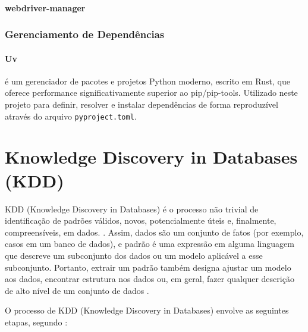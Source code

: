 \paragraph{webdriver-manager} 

\subsubsection{Gerenciamento de Dependências}

\paragraph{Uv} é um gerenciador de pacotes e projetos Python moderno, escrito em Rust, que oferece performance significativamente superior ao pip/pip-tools. Utilizado neste projeto para definir, resolver e instalar dependências de forma reproduzível através do arquivo \texttt{pyproject.toml}.


\section{Knowledge Discovery in Databases (KDD)}
KDD (Knowledge Discovery in Databases) é o processo não trivial de
identificação de padrões válidos, novos, potencialmente úteis e, finalmente, compreensíveis, em dados. \cite{fayyad1996kdd}. Assim, dados são um conjunto de fatos (por exemplo, casos em um banco de dados), e padrão é uma expressão em alguma linguagem que descreve um subconjunto dos dados ou um modelo aplicável a esse subconjunto. Portanto, extrair um padrão também designa ajustar um modelo aos dados, encontrar estrutura nos dados ou, em geral, fazer qualquer descrição de alto nível de um conjunto de dados \cite{fayyad1996kdd}.

O processo de KDD (Knowledge Discovery in Databases) envolve as seguintes etapas, segundo \cite{han2012datamining}:

